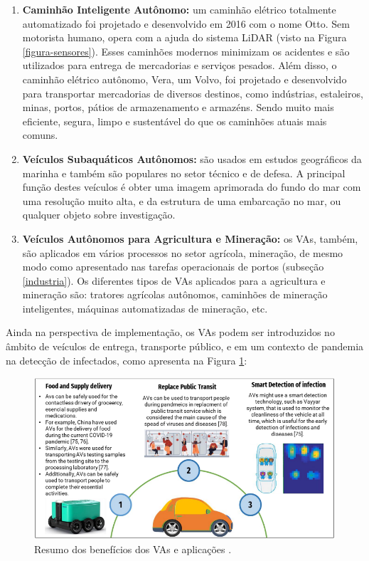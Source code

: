 \begin{enumerate}
\item \textbf{Caminhão Inteligente Autônomo:} um caminhão elétrico totalmente automatizado foi projetado e desenvolvido em 2016 com o nome Otto. Sem motorista humano, opera com a ajuda do sistema LiDAR (visto na Figura \ref{figura-sensores}). Esses caminhões modernos minimizam os acidentes e são utilizados para entrega de mercadorias e serviços pesados. Além disso, o caminhão elétrico autônomo, Vera, um Volvo, foi projetado e desenvolvido para transportar mercadorias de diversos destinos, como indústrias, estaleiros, minas, portos, pátios de armazenamento e armazéns. Sendo muito mais eficiente, segura, limpo e sustentável do que os caminhões atuais mais comuns.

\item \textbf{Veículos Subaquáticos Autônomos:} são usados em estudos geográficos da marinha e também são populares no setor técnico e de defesa. A principal função destes veículos é obter uma imagem aprimorada do fundo do mar com uma resolução muito alta, e da estrutura de uma embarcação no mar, ou qualquer objeto sobre investigação.
\item \textbf{Veículos Autônomos para Agricultura e Mineração:}  os VAs, também, são aplicados em vários processos no setor agrícola, mineração, de mesmo modo como apresentado nas tarefas operacionais de portos (subseção \ref{industria}). Os diferentes tipos de VAs aplicados para a agricultura e mineração são: tratores agrícolas autônomos, caminhões de mineração inteligentes, máquinas automatizadas de mineração, etc.

\end{enumerate}

Ainda na perspectiva de implementação, os VAs podem ser introduzidos no âmbito de veículos de entrega, transporte público, e em um contexto de pandemia na detecção de infectados, como apresenta na Figura \ref{resumo_aplic}:

\begin{figure}[H]
\centering
\includegraphics[width=\textwidth]{Figures/aplic.png}
\caption{Resumo dos benefícios dos VAs e aplicações \cite{mundobrasil}.}
\label{resumo_aplic}
\end{figure}


